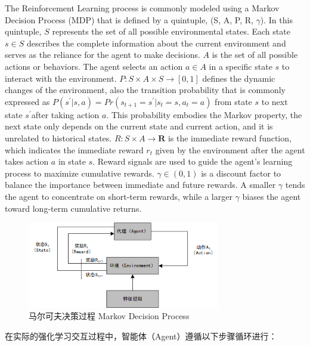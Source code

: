 The Reinforcement Learning process is commonly modeled using a Markov Decision Process (MDP) that is defined by a quintuple, (S, A, P, R, $\gamma$).
In this quintuple, $S$ represents the set of all possible environmental states. Each state $s\in S$ describes the complete information about the current environment and serves as the reliance for the agent to make decisions.
$A$ is the set of all possible actions or behaviors. The agent selects an action $a\in A$ in a specific state $s$ to interact with the environment.
$P:S\times A\times S \to [0,1]$ defines the dynamic changes of the environment, also the transition probability that is commonly expressed as $P(s^{'}|s,a)=Pr(s_{t+1}=s^{'}|s_{t}=s,a_{t}=a)$ from state $s$ to next state $s^{'}$after taking action $a$. This probability embodies the Markov property, the next state only depends on the current state and current action, and it is unrelated to historical states.
$R:S\times A \to \mathbf{R}$ is the immediate reward function, which indicates the immediate reward $r_{t}$ given by the environment after the agent takes action $a$ in state $s$. Reward signals are used to guide the agent’s learning process to maximize cumulative rewards.
$\gamma \in (0,1)$ is a discount factor to balance the importance between immediate and future rewards. A smaller $\gamma$ tends the agent to concentrate on short-term rewards, while a larger $\gamma$ biases the agent toward long-term cumulative returns.

\begin{figure}[hbt]
	\centering
	\includegraphics[width=0.75\textwidth]{figures/2.3}
	\caption{马尔可夫决策过程 Markov Decision Process}\label{fig:2.3}
\end{figure}

在实际的强化学习交互过程中，智能体（Agent）遵循以下步骤循环进行：

